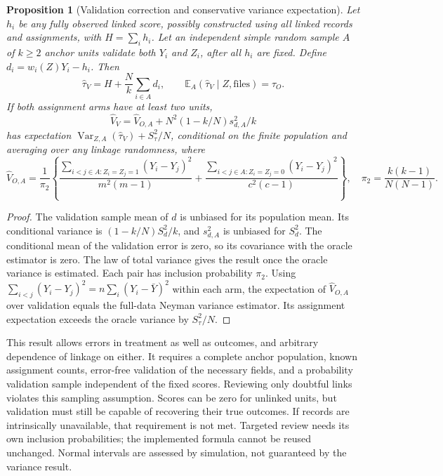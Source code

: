 \documentclass[11pt]{article}
\newtheorem{proposition}{Proposition}
\newcommand{\E}{\mathbb E}
\newcommand{\V}{\operatorname{Var}}
\begin{document}
\begin{proposition}[Validation correction and conservative variance expectation]
Let $h_i$ be any fully observed linked score, possibly constructed using all linked
records and assignments, with $H=\sum_i h_i$. Let an independent simple random sample
$A$ of $k\ge2$ anchor units validate both $Y_i$ and $Z_i$, after all $h_i$ are fixed.
Define $d_i=w_i(Z)Y_i-h_i$. Then
\[
 \widehat\tau_V=H+\frac Nk\sum_{i\in A}d_i,
 \qquad \E_A(\widehat\tau_V\mid Z,\text{files})=\widehat\tau_O.
\]
If both assignment arms have at least two units,
\[
 \widehat V_V=\widehat V_{O,A}+N^2(1-k/N)s_{d,A}^2/k
\]
has expectation $\V_{Z,A}(\widehat\tau_V)+S_\tau^2/N$, conditional on the finite
population and averaging over any linkage randomness, where
\[
 \widehat V_{O,A}=\frac1{\pi_2}\left\{
 \frac{\sum_{i<j\in A:Z_i=Z_j=1}(Y_i-Y_j)^2}{m^2(m-1)}+
 \frac{\sum_{i<j\in A:Z_i=Z_j=0}(Y_i-Y_j)^2}{c^2(c-1)}\right\},
 \quad \pi_2=\frac{k(k-1)}{N(N-1)}.
\]
\end{proposition}
\begin{proof}
The validation sample mean of $d$ is unbiased for its population mean. Its conditional
variance is $(1-k/N)S_d^2/k$, and $s_{d,A}^2$ is unbiased for $S_d^2$.
The conditional mean of the validation error is zero, so its covariance with the
oracle estimator is zero. The law of total variance gives the result once the oracle
variance is estimated. Each pair has inclusion probability $\pi_2$.
Using $\sum_{i<j}(Y_i-Y_j)^2=n\sum_i(Y_i-\bar Y)^2$ within each arm, the expectation
of $\widehat V_{O,A}$ over validation equals the full-data Neyman variance estimator.
Its assignment expectation exceeds the oracle variance by $S_\tau^2/N$.
\end{proof}
This result allows errors in treatment as well as outcomes, and arbitrary dependence
of linkage on either. It requires a complete anchor population, known assignment
counts, error-free validation of the necessary fields, and a probability validation
sample independent of the fixed scores. Reviewing only doubtful links violates this
sampling assumption. Scores can be zero for unlinked units, but validation must still
be capable of recovering their true outcomes. If records are intrinsically unavailable,
that requirement is not met. Targeted review needs its own inclusion probabilities;
the implemented formula cannot be reused unchanged. Normal intervals are assessed by
simulation, not guaranteed by the variance result.
\end{document}
